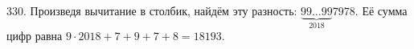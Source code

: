 330. Произведя вычитание в столбик, найдём эту разность: $\underbrace{99\ldots99}_{2018}7978.$ Её сумма цифр равна $9\cdot2018+7+9+7+8=18193.$\\
